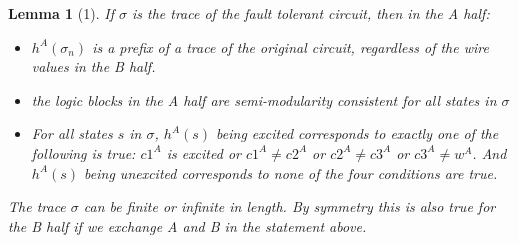 \documentclass[12pt]{report}
\newtheorem*{lemma}{Lemma}
\begin{document}
\begin{lemma}[1]
If $\sigma$ is the trace of the fault tolerant circuit, then in the A half:
\begin{itemize}
\item  $h^{A}(\sigma_n)$ is a prefix of a trace of the original circuit, regardless of the wire values in the B half.
\item the logic blocks in the A half are semi-modularity consistent for all states in $\sigma$
\item For all states $s$ in $\sigma$, $h^A(s)$ being excited corresponds to exactly one of the following is true: $c1^A$ is excited or $c1^{A}\neq c2^{A}$ or $c2^{A}\neq c3^A$ or $c3^{A}\neq w^A$.  And $h^A(s)$ being unexcited corresponds to none of the four conditions are true.
\end{itemize}

The trace $\sigma$ can be finite or infinite in length.  
By symmetry this is also true for the B half if we exchange A and B in the statement above.


\end{lemma}
\end{document}
